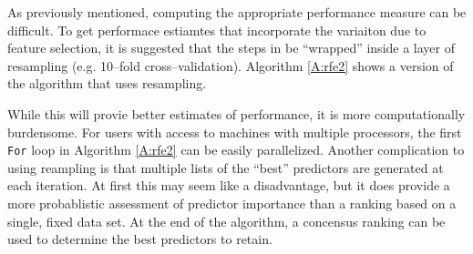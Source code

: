 \documentclass[12pt]{article}
\begin{document}
As previously mentioned, computing the appropriate performance measure can be difficult. To get performace estiamtes that incorporate the variaiton due to feature selection, it is suggested that the steps in be ``wrapped'' inside a layer of resampling (e.g. 10--fold cross--validation). Algorithm \ref{A:rfe2} shows a version of the algorithm that uses resampling.

While this will provie better estimates of performance, it is more computationally burdensome. For users with access to machines with multiple processors, the first \texttt{For} loop in Algorithm \ref{A:rfe2} can be easily parallelized. Another complication to using reampling is that multiple lists of the ``best'' predictors are generated at each iteration. At first this may seem like a disadvantage, but it does provide a more probablistic assessment of predictor importance than a ranking based on a single, fixed data set. At the end of the algorithm, a concensus ranking can be used to determine the best predictors to retain.
\end{document}
